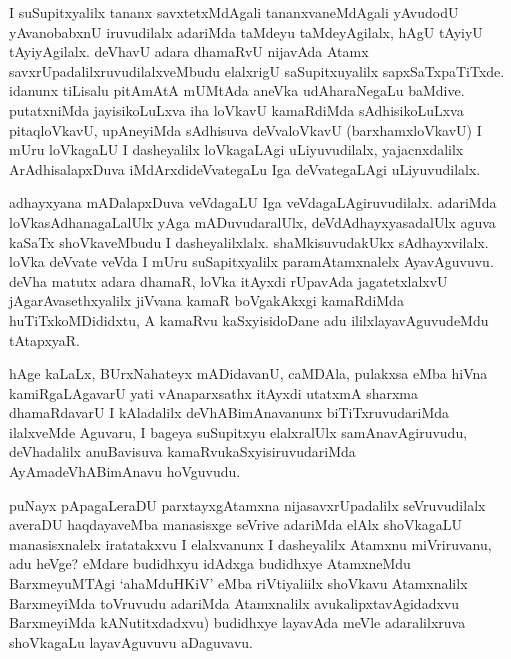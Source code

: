 
\begin{artha}
I suSupitxyalilx tananx savxtetxMdAgali tananxvaneMdAgali yAvudodU yAvanobabxnU iruvudilalx adariMda taMdeyu taMdeyAgilalx, hAgU tAyiyU tAyiyAgilalx. deVhavU adara dhamaRvU nijavAda Atamx savxrUpadalilxruvudilalxveMbudu elalxrigU saSupitxuyalilx sapxSaTxpaTiTxde. idanunx tiLisalu pitAmAtA mUMtAda aneVka udAharaNegaLu baMdive. putatxniMda jayisikoLuLxva iha loVkavU kamaRdiMda sAdhisikoLuLxva pitaqloVkavU, upAneyiMda sAdhisuva deVvaloVkavU (barxhamxloVkavU) I mUru loVkagaLU I dasheyalilx loVkagaLAgi uLiyuvudilalx, yajacnxdalilx ArAdhisalapxDuva iMdArxdideVvategaLu Iga deVvategaLAgi uLiyuvudilalx. 
\end{artha}

\begin{artha}%
adhayxyana mADalapxDuva veVdagaLU Iga veVdagaLAgiruvudilalx. adariMda loVkasAdhanagaLalUlx yAga mADuvudaralUlx, deVdAdhayxyasadalUlx aguva kaSaTx shoVkaveMbudu I dasheyalilxlalx. shaMkisuvudakUkx sAdhayxvilalx. loVka deVvate veVda I mUru suSapitxyalilx paramAtamxnalelx AyavAguvuvu. deVha matutx adara dhamaR, loVka itAyxdi rUpavAda jagatetxlalxvU jAgarAvasethxyalilx jiVvana kamaR boVgakAkxgi kamaRdiMda huTiTxkoMDididxtu, A kamaRvu kaSxyisidoDane adu ililxlayavAguvudeMdu tAtapxyaR. 
\end{artha}


\begin{artha}
hAge kaLaLx, BUrxNahateyx mADidavanU, caMDAla, pulakxsa eMba hiVna kamiRgaLAgavarU yati vAnaparxsathx itAyxdi utatxmA sharxma dhamaRdavarU I kAladalilx deVhABimAnavanunx biTiTxruvudariMda ilalxveMde Aguvaru, I bageya suSupitxyu elalxralUlx samAnavAgiruvudu, deVhadalilx anuBavisuva kamaRvukaSxyisiruvudariMda AyAmadeVhABimAnavu hoVguvudu. 
\end{artha}


\begin{artha}
puNayx pApagaLeraDU parxtayxgAtamxna nijasavxrUpadalilx seVruvudilalx averaDU haqdayaveMba manasisxge seVrive adariMda elAlx shoVkagaLU manasisxnalelx iratatakxvu I elalxvanunx I dasheyalilx Atamxnu miVriruvanu, adu heVge? eMdare budidhxyu idAdxga budidhxye AtamxneMdu BarxmeyuMTAgi `ahaMduHKiV' eMba riVtiyaliilx shoVkavu Atamxnalilx BarxmeyiMda toVruvudu adariMda Atamxnalilx avukalipxtavAgidadxvu BarxmeyiMda kANutitxdadxvu) budidhxye layavAda meVle adaralilxruva shoVkagaLu layavAguvuvu aDaguvavu. 
\end{artha}

